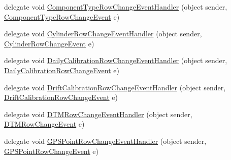 \begin{DoxyCompactItemize}
\item 
delegate void \hyperlink{class_env_int_1_1_win32_1_1_field_tech_1_1_manager_1_1_data_sets_1_1_guide_ware_mobile_data_set_abd1972df64c9aa03de1019f79a6c4631}{Component\+Type\+Row\+Change\+Event\+Handler} (object sender, \hyperlink{class_env_int_1_1_win32_1_1_field_tech_1_1_manager_1_1_data_sets_1_1_guide_ware_mobile_data_set_6cb4a1a3a59d09909759d45113e3e872}{Component\+Type\+Row\+Change\+Event} e)
\item 
delegate void \hyperlink{class_env_int_1_1_win32_1_1_field_tech_1_1_manager_1_1_data_sets_1_1_guide_ware_mobile_data_set_a8633b3d698f0ad882a4faeba4841f6ee}{Cylinder\+Row\+Change\+Event\+Handler} (object sender, \hyperlink{class_env_int_1_1_win32_1_1_field_tech_1_1_manager_1_1_data_sets_1_1_guide_ware_mobile_data_set_1_1_cylinder_row_change_event}{Cylinder\+Row\+Change\+Event} e)
\item 
delegate void \hyperlink{class_env_int_1_1_win32_1_1_field_tech_1_1_manager_1_1_data_sets_1_1_guide_ware_mobile_data_set_a6595251b6d65dffbbe61ca816dadb518}{Daily\+Calibration\+Row\+Change\+Event\+Handler} (object sender, \hyperlink{class_env_int_1_1_win32_1_1_field_tech_1_1_manager_1_1_data_sets_1_1_guide_ware_mobile_data_set_3eedff0336860edbfd90e1bca2652873}{Daily\+Calibration\+Row\+Change\+Event} e)
\item 
delegate void \hyperlink{class_env_int_1_1_win32_1_1_field_tech_1_1_manager_1_1_data_sets_1_1_guide_ware_mobile_data_set_a74711d801985d4a45cabf719e45510fc}{Drift\+Calibration\+Row\+Change\+Event\+Handler} (object sender, \hyperlink{class_env_int_1_1_win32_1_1_field_tech_1_1_manager_1_1_data_sets_1_1_guide_ware_mobile_data_set_aa92b3413cef1716fa2c99ea466ba9d7}{Drift\+Calibration\+Row\+Change\+Event} e)
\item 
delegate void \hyperlink{class_env_int_1_1_win32_1_1_field_tech_1_1_manager_1_1_data_sets_1_1_guide_ware_mobile_data_set_abe0bdf2a1603396d939e3b7d67751cd0}{D\+T\+M\+Row\+Change\+Event\+Handler} (object sender, \hyperlink{class_env_int_1_1_win32_1_1_field_tech_1_1_manager_1_1_data_sets_1_1_guide_ware_mobile_data_set_1_1_d_t_m_row_change_event}{D\+T\+M\+Row\+Change\+Event} e)
\item 
delegate void \hyperlink{class_env_int_1_1_win32_1_1_field_tech_1_1_manager_1_1_data_sets_1_1_guide_ware_mobile_data_set_a5ace8b260a4d9a8220395bb6e8bf5c0f}{G\+P\+S\+Point\+Row\+Change\+Event\+Handler} (object sender, \hyperlink{class_env_int_1_1_win32_1_1_field_tech_1_1_manager_1_1_data_sets_1_1_guide_ware_mobile_data_set_baf5953e40523560f37c87dac2e88271}{G\+P\+S\+Point\+Row\+Change\+Event} e)

\end{DoxyCompactItemize}
